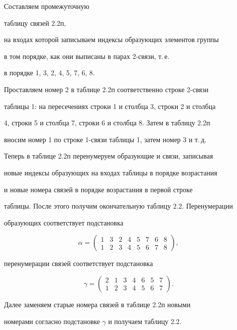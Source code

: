 Составляем промежуточную


таблицу связей 2.2п,   %


на входах которой записываем индексы образующих элементов группы


в том порядке, как они выписаны в парах 2-связи, т.\,е.


в порядке 1, 3, 2, 4, 5, 7, 6, 8.


Проставляем номер 2 в таблице 2.2п соответственно строке 2-связи


таблицы 1: на пересечениях строки 1 и столбца 3, строки 2 и столбца


4, строки 5 и столбца 7, строки 6 и столбца 8. Затем в таблицу 2.2п


вносим номер 1 по строке 1-связи таблицы 1, затем номер 3 и т.\,д.





Теперь в таблице 2.2п перенумеруем образующие и связи, записывая 


новые индексы образующих на входах таблицы в порядке возрастания 


и новые номера связей в порядке возрастания в первой строке


таблицы. После этого получим окончательную таблицу 2.2. Перенумерации 


образующих соответствует подстановка


$$


\alpha=\begin{pmatrix} 1 & 3 & 2 & 4 & 5 & 7 & 6 & 8 \\


1 & 2 & 3 & 4 & 5 & 6 & 7 & 8 \end{pmatrix},


$$


перенумерации связей соответствует подстановка


$$


\gamma=\begin{pmatrix} 2 & 1 & 3 & 4 & 6 & 5 & 7 \\


1 & 2 & 3 & 4 & 5 & 6 & 7 \end{pmatrix}.


$$


Далее заменяем старые номера связей в таблице 2.2п новыми 


номерами согласно подстановке $\gamma$ и получаем таблицу 2.2.


\smallskip





